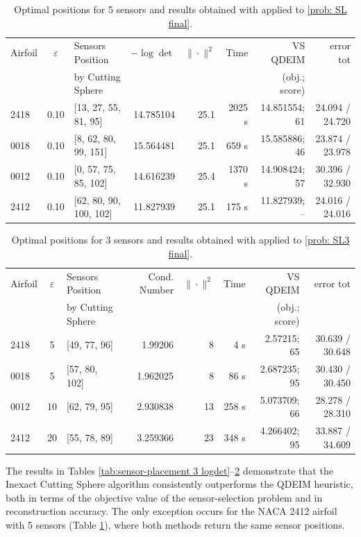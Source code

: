 \documentclass[12pt]{amsart}
\theoremstyle{plain}
\theoremstyle{definition}
\begin{document}
\begin{table}[htbp]
\centering
\small
\caption{Optimal positions for 5 sensors and results obtained with \cite[Algorithm 3]{bednarczuk2026outer} applied to \eqref{prob: SL final}.}
\label{tab:sensor-placement 5 logdet}
\begin{tabular}{l | c | l | r | r | r | r | r}
\hline
Airfoil & \(\varepsilon\) & Sensors Position & \(-\log\det\) & \(\|\cdot\|^2\) & Time & VS QDEIM & error tot \\
 &  & by Cutting Sphere &   &  &  & (obj.; score) & \\
\hline
2418 & 0.10 & [13, 27, 55, 81, 95] & 14.785104 & 25.1 & 2025 s & 14.851554; 61 & 24.094 / 24.720 \\
0018 & 0.10 & [8, 62, 80, 99, 151] & 15.564481 & 25.1 & 659 s & 15.585886; 46 & 23.874 / 23.978 \\
0012 & 0.10 & [0, 57, 75, 85, 102] & 14.616239 & 25.4 & 1370 s & 14.908424; 57 & 30.396 / 32.930 \\
2412 & 0.10 & [62, 80, 90, 100, 102] & 11.827939 & 25.1 & 175 s & 11.827939; -- & 24.016 / 24.016 \\
\hline
\end{tabular}
\end{table}

\begin{table}[htbp]
\centering
\small
\caption{Optimal positions for 3 sensors and results obtained with \cite[Algorithm 3]{bednarczuk2026outer} applied to \eqref{prob: SL3 final}.}
\label{tab:sensor-placement 3 condition number}
\begin{tabular}{l | c | l | r | r | r | r | r}
\hline
Airfoil & \(\varepsilon\) & Sensors Position & Cond. Number & \(\|\cdot\|^2\) & Time & VS QDEIM & error tot \\
 &  & by Cutting Sphere &   &  &  & (obj.; score) & \\
\hline
2418 & 5 & [49, 77, 96] & 1.99206 & 8 & 4 s & 2.57215; 65 & 30.639 / 30.648 \\
0018 & 5 & [57, 80, 102] & 1.962025 & 8 & 86 s & 2.687235; 95 & 30.430 / 30.450 \\
0012 & 10 & [62, 79, 95] & 2.930838 & 13 & 258 s & 5.073709; 66 & 28.278 / 28.310 \\
2412 & 20 & [55, 78, 89] & 3.259366 & 23 & 348 s & 4.266402; 95 & 33.887 / 34.609 \\
\hline
\end{tabular}
\end{table}

The results in Tables \ref{tab:sensor-placement 3 logdet}--\ref{tab:sensor-placement 3 condition number} demonstrate that the Inexact Cutting Sphere algorithm \cite[Algorithm 3]{bednarczuk2026outer} consistently outperforms the QDEIM heuristic, both in terms of the objective value of the sensor-selection problem and in reconstruction accuracy.
The only exception occurs for the NACA 2412 airfoil with 5 sensors (Table \ref{tab:sensor-placement 5 logdet}), where both methods return the same sensor positions.
\end{document}
